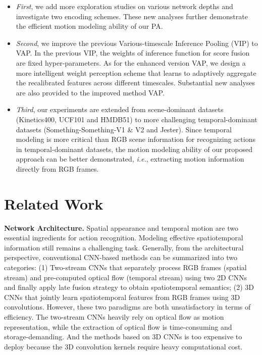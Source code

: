 \documentclass[journal]{IEEEtran}
\begin{document}
\begin{itemize}
\item \emph{First}, we add more exploration studies on various network depths and investigate two encoding schemes. These new analyses further demonstrate the efficient motion modeling ability of our PA.

\item \emph{Second}, we improve the previous Various-timescale Inference Pooling (VIP) \cite{Zhang2019PANPA} to VAP. In the previous VIP, the weights of inference function for score fusion are fixed hyper-parameters. As for the enhanced version VAP, we design a more intelligent weight perception scheme that learns to adaptively aggregate the recalibrated features across different timescales. Substantial new analyses are also provided to the improved method VAP. 

\item \emph{Third}, our experiments are extended from scene-dominant datasets (Kinetics400, UCF101 and HMDB51) to more challenging temporal-dominant datasets (Something-Something-V1 \& V2 and Jester). Since temporal modeling is more critical than RGB scene information for recognizing actions in temporal-dominant datasets, the motion modeling ability of our proposed approach can be better demonstrated, \emph{i.e.}, extracting motion information directly from RGB frames.
\end{itemize}

\section{Related Work} \label{section:relatedwork}



\textbf{Network Architecture.} Spatial appearance and temporal motion are two essential ingredients for action recognition. Modeling effective spatiotemporal information still remains a challenging task. Generally, from the architectural perspective, conventional CNN-based methods can be summarized into two categories: (1) Two-stream CNNs \cite{simonyan2014two,feichtenhofer2016convolutional,Zhang2018RealTimeAR,wang2016temporal,zhu2017hidden} that separately process RGB frames (spatial stream) and pre-computed optical flow (temporal stream) using two 2D CNNs and finally apply late fusion strategy to obtain spatiotemporal semantics; (2) 3D CNNs \cite{ji20133d,tran2015learning,qiu2017learning,carreira2017quo} that jointly learn spatiotemporal features from RGB frames using 3D convolutions. However, these two paradigms are both unsatisfactory in terms of efficiency. The two-stream CNNs heavily rely on optical flow as motion representation, while the extraction of optical flow is time-consuming and storage-demanding. And the methods based on 3D CNNs is too expensive to deploy because the 3D convolution kernels require heavy computational cost.
\end{document}
